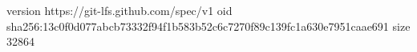 version https://git-lfs.github.com/spec/v1
oid sha256:13c0f0d077abcb73332f94f1b583b52c6c7270f89c139fc1a630e7951caae691
size 32864
